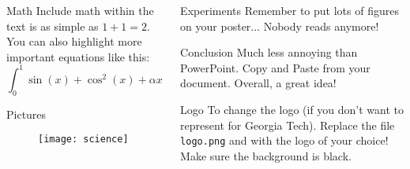 \documentclass[serif,mathserif,final]{beamer}
\begin{document}
\begin{frame}{}
\begin{columns}[t]
\begin{column}{0.32\linewidth}
      \begin{block}{Math}
        Include math within the text is as simple as $1+1=2$.  You can also
        highlight more important equations like this:
        \begin{equation*}
          \int_0^1\sin(x)+\cos^2(x)+\alpha x~d\!x
        \end{equation*}
      \end{block}

      \begin{block}{Pictures}
        \begin{figure}[htb]
          \centering
          \texttt{[image: science]}
        \end{figure}
      \end{block}

    \end{column}%

    \begin{column}{0.32\linewidth}

      \begin{block}{Experiments}
        Remember to put lots of figures on your poster... Nobody reads anymore!
      \end{block}

      \begin{block}{Conclusion}
        Much less annoying than PowerPoint.  Copy and Paste from your
        document. Overall, a great idea!
      \end{block}

      \begin{block}{Logo}
        To change the logo (if you don't want to represent for Georgia Tech).
        Replace the file {\tt logo.png} and with the logo of your choice!
        Make sure the background is black.
      \end{block}

    \end{column}%

  \end{columns}
\end{frame}
\end{document}
